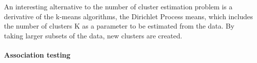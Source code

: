 An interesting alternative to the number of cluster estimation problem is a derivative of the k-means algorithms,
the Dirichlet Process means, which includes the number of clusters
K as a parameter to be estimated from the data.
By taking larger subsets of the data, new clusters are created.


%
%


\paragraph{Association testing}

